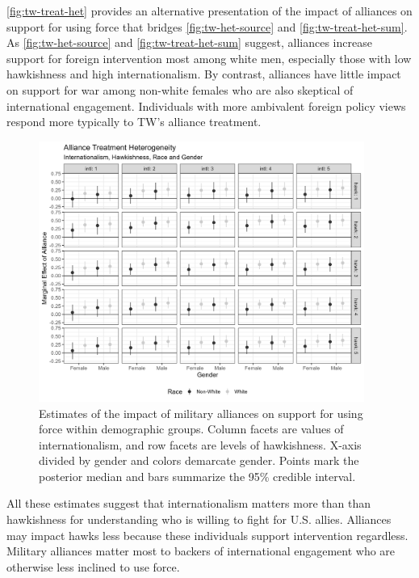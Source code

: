 \documentclass[12pt]{article}
\begin{document}
\autoref{fig:tw-treat-het} provides an alternative presentation of the impact of alliances on support for using force that bridges \autoref{fig:tw-het-source} and \autoref{fig:tw-treat-het-sum}. 
As \autoref{fig:tw-het-source} and \autoref{fig:tw-treat-het-sum} suggest, alliances increase support for foreign intervention most among white men, especially those with low hawkishness and high internationalism.
By contrast, alliances have little impact on support for war among non-white females who are also skeptical of international engagement.
Individuals with more ambivalent foreign policy views respond more typically to TW's alliance treatment. 


\begin{figure}[htpb]
	\centering
		\includegraphics[width=0.95\textwidth]{../figures/tw-treat-het.png}
	\caption{Estimates of the impact of military alliances on support for using force within demographic groups. Column facets are values of internationalism, and row facets are levels of hawkishness. X-axis divided by gender and colors demarcate gender. Points mark the posterior median and bars summarize the 95\% credible interval.}
	\label{fig:tw-treat-het}
\end{figure}


All these estimates suggest that internationalism matters more than than hawkishness for understanding who is willing to fight for U.S. allies. 
Alliances may impact hawks less because these individuals support intervention regardless. 
Military alliances matter most to backers of international engagement who are otherwise less inclined to use force. 
\end{document}
